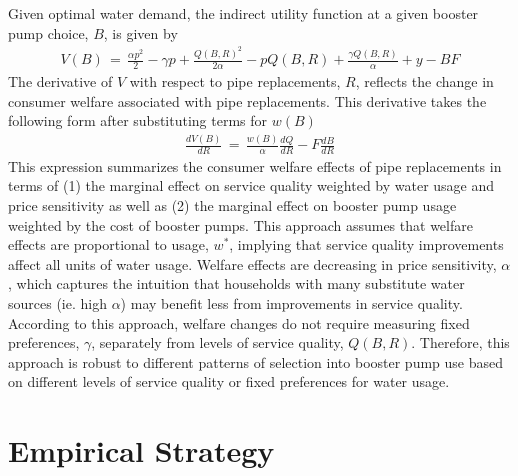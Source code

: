 \documentclass[12pt,table]{article}
\begin{document}
Given optimal water demand, the indirect utility function at a given booster pump choice, $B$, is given by 
\begin{align}
V(B)\,=\,\frac{\alpha p^2}{2} - \gamma p + \frac{Q(B,R)^{2}}{2\alpha} - p Q(B,R) + \frac{\gamma Q(B,R)}{\alpha} + y - B F
\end{align}
The derivative of $V$ with respect to pipe replacements, $R$, reflects the change in consumer welfare associated with pipe replacements.  This derivative takes the following form after substituting terms for $w(B)$
\begin{align}
\label{eq:dvdr}
\frac{dV(B)}{dR}\,=\,\frac{w(B)}{\alpha} \frac{dQ}{dR} - F \frac{dB}{dR}
\end{align}
This expression summarizes the consumer welfare effects of pipe replacements in terms of (1) the marginal effect on service quality weighted by water usage and price sensitivity as well as (2) the marginal effect on booster pump usage weighted by the cost of booster pumps.  This approach assumes that welfare effects are proportional to usage, $w^{*}$, implying that service quality improvements affect all units of water usage.  Welfare effects are decreasing in price sensitivity, $\alpha$, which captures the intuition that households with many substitute water sources (ie. high $\alpha$) may benefit less from improvements in service quality.  According to this approach, welfare changes do not require measuring fixed preferences, $\gamma$, separately from levels of service quality, $Q(B,R)$.  Therefore, this approach is robust to different patterns of selection into booster pump use based on different levels of service quality or fixed preferences for water usage.  



\section{Empirical Strategy}\label{section:empiricalstrategy}
\end{document}

